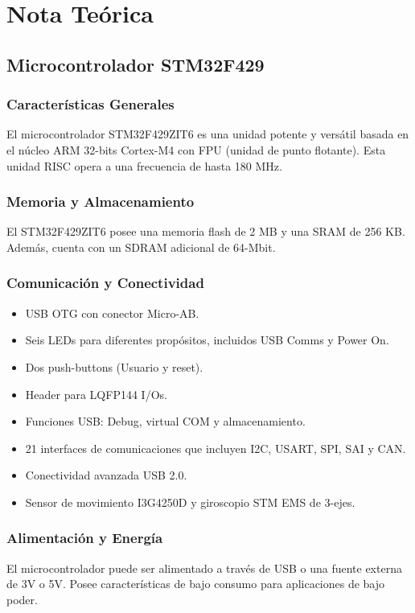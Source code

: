 \section{Nota Teórica}
\subsection{Microcontrolador STM32F429}
\subsubsection{Características Generales}
El microcontrolador STM32F429ZIT6 es una unidad potente y versátil basada en el núcleo ARM 32-bits Cortex-M4 con FPU (unidad de punto flotante). Esta unidad RISC opera a una frecuencia de hasta 180 MHz.

\subsubsection{Memoria y Almacenamiento}
El STM32F429ZIT6 posee una memoria flash de 2 MB y una SRAM de 256 KB. Además, cuenta con un SDRAM adicional de 64-Mbit.


\subsubsection{Comunicación y Conectividad}
\begin{itemize}
    \item USB OTG con conector Micro-AB.
    \item Seis LEDs para diferentes propósitos, incluidos USB Comms y Power On.
    \item Dos push-buttons (Usuario y reset).
    \item Header para LQFP144 I/Os.
    \item Funciones USB: Debug, virtual COM y almacenamiento.
    \item 21 interfaces de comunicaciones que incluyen I2C, USART, SPI, SAI y CAN.
    \item Conectividad avanzada USB 2.0.
    \item Sensor de movimiento I3G4250D y giroscopio STM EMS de 3-ejes.
\end{itemize}

\subsubsection{Alimentación y Energía}
El microcontrolador puede ser alimentado a través de USB o una fuente externa de 3V o 5V. Posee características de bajo consumo para aplicaciones de bajo poder.

